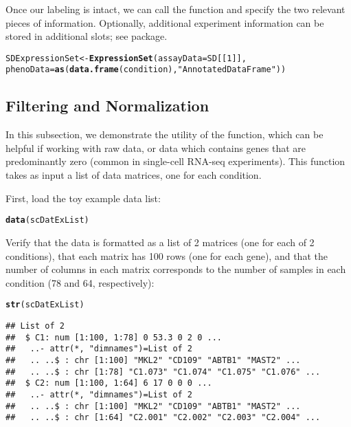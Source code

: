 \documentclass{article}\usepackage[]{graphicx}\usepackage[]{color}
\makeatletter
\newcommand{\hlnum}[1]{\textcolor[rgb]{0.686,0.059,0.569}{#1}}%
\newcommand{\hlstr}[1]{\textcolor[rgb]{0.192,0.494,0.8}{#1}}%
\newcommand{\hlstd}[1]{\textcolor[rgb]{0.345,0.345,0.345}{#1}}%
\newcommand{\hlkwb}[1]{\textcolor[rgb]{0.69,0.353,0.396}{#1}}%
\newcommand{\hlkwc}[1]{\textcolor[rgb]{0.333,0.667,0.333}{#1}}%
\newcommand{\hlkwd}[1]{\textcolor[rgb]{0.737,0.353,0.396}{\textbf{#1}}}%
\newenvironment{kframe}{%
 \def\at@end@of@kframe{}%
 \ifinner\ifhmode%
  \def\at@end@of@kframe{\end{minipage}}%
  \begin{minipage}{\columnwidth}%
 \fi\fi%
 \def\FrameCommand##1{\hskip\@totalleftmargin \hskip-\fboxsep
 \colorbox{shadecolor}{##1}\hskip-\fboxsep
     \hskip-\linewidth \hskip-\@totalleftmargin \hskip\columnwidth}%
 \MakeFramed {\advance\hsize-\width
   \@totalleftmargin\z@ \linewidth\hsize
   \@setminipage}}%
 {\par\unskip\endMakeFramed%
 \at@end@of@kframe}
\newenvironment{knitrout}{}{} %
\makeatother
\begin{document}
Once our labeling is intact, we can call the  function and specify the two relevant pieces of information.  Optionally, additional experiment information can be stored in additional slots; see  package.
\begin{knitrout}
\color{fgcolor}\begin{kframe}
\begin{alltt}
\hlstd{SDExpressionSet} \hlkwb{<-} \hlkwd{ExpressionSet}\hlstd{(}\hlkwc{assayData}\hlstd{=SD[[}\hlnum{1}\hlstd{]],}
                    \hlkwc{phenoData}\hlstd{=}\hlkwd{as}\hlstd{(}\hlkwd{data.frame}\hlstd{(condition),} \hlstr{"AnnotatedDataFrame"}\hlstd{))}
\end{alltt}
\end{kframe}
\end{knitrout}

\subsection{Filtering and Normalization}

In this subsection, we demonstrate the utility of the  function, which can be helpful if working with raw data, or data which contains genes that are predominantly zero (common in single-cell RNA-seq experiments).  This function takes as input a list of data matrices, one for each condition.

First, load the toy example data list:
\begin{knitrout}
\color{fgcolor}\begin{kframe}
\begin{alltt}
\hlkwd{data}\hlstd{(scDatExList)}
\end{alltt}
\end{kframe}
\end{knitrout}

Verify that the data is formatted as a list of 2 matrices (one for each of 2 conditions), that each matrix has 100 rows (one for each gene), and that the number of columns in each matrix corresponds to the number of samples in each condition (78 and 64, respectively):
\begin{knitrout}
\color{fgcolor}\begin{kframe}
\begin{alltt}
\hlkwd{str}\hlstd{(scDatExList)}
\end{alltt}
\begin{verbatim}
## List of 2
##  $ C1: num [1:100, 1:78] 0 53.3 0 2 0 ...
##   ..- attr(*, "dimnames")=List of 2
##   .. ..$ : chr [1:100] "MKL2" "CD109" "ABTB1" "MAST2" ...
##   .. ..$ : chr [1:78] "C1.073" "C1.074" "C1.075" "C1.076" ...
##  $ C2: num [1:100, 1:64] 6 17 0 0 0 ...
##   ..- attr(*, "dimnames")=List of 2
##   .. ..$ : chr [1:100] "MKL2" "CD109" "ABTB1" "MAST2" ...
##   .. ..$ : chr [1:64] "C2.001" "C2.002" "C2.003" "C2.004" ...
\end{verbatim}
\end{kframe}
\end{knitrout}
\end{document}
